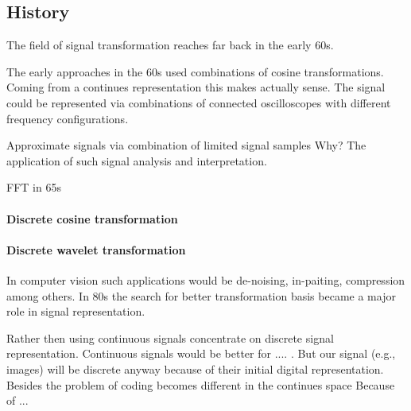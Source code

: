 \subsection{History}
\label{sec:history}
The field of signal transformation reaches far back in the early 60s.\cite{Rubinstein2010}

The early approaches in the 60s used combinations of cosine transformations. Coming from a continues representation this makes 
actually sense. The signal could be represented via combinations of connected oscilloscopes with different frequency configurations. 

Approximate signals via combination of limited signal samples
Why?
The application of such signal analysis and interpretation.


FFT in 65s



\paragraph{Discrete cosine transformation}
\Todo{}

\paragraph{Discrete wavelet transformation}
\Todo{}

In computer vision such applications would be de-noising, in-paiting, compression among others.
In 80s the search for better transformation basis became a major role in signal representation. \cite{}

Rather then using continuous signals concentrate on discrete signal representation.
Continuous signals would be better for .... . 
But our signal (e.g., images) will be discrete anyway because of their initial digital representation. 
Besides the problem of coding becomes different in the continues space \cite{} Because of ...

